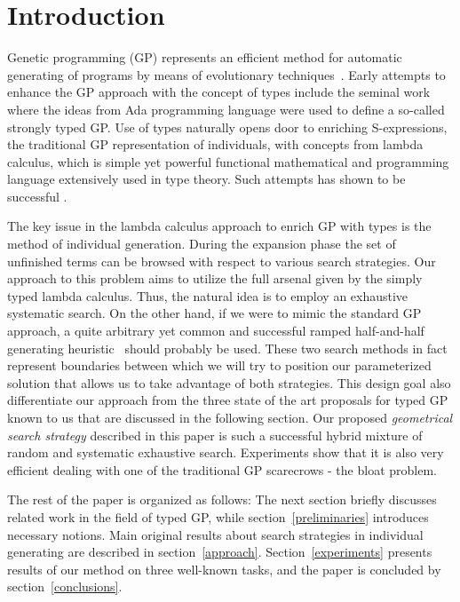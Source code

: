 \documentclass{sig-alternate}
\begin{document}


\section{Introduction}

Genetic programming (GP) represents an efficient method for automatic generating of programs by means of evolutionary techniques~\cite{koza92,koza03}. Early attempts to enhance the GP approach with the concept of types include the seminal work~\cite{montana95} where the ideas from Ada programming language were used to define a so-called strongly typed GP.   
Use of types naturally opens door to enriching S-expressions,
the traditional GP representation of individuals, with concepts from
lambda calculus, which is simple yet powerful functional mathematical and programming 
language extensively used in type theory. Such attempts has shown to be 
successful \cite{yu01}. 

The key issue in the lambda calculus approach to enrich GP with types is the method of individual generation. During the expansion phase the set of unfinished terms can be browsed with respect to various search strategies. Our approach to this problem aims to utilize the full arsenal given by the simply typed lambda calculus. Thus, the natural idea is to employ an exhaustive systematic search. On the other hand, if we were to mimic the standard GP approach, a quite arbitrary yet common and successful ramped half-and-half generating heuristic~\cite{fg} should probably be used.  
These two search methods in fact represent boundaries between which we will try to position our parameterized solution that allows us to take advantage of both strategies. This design goal also differentiate our approach from 
the three state of the art proposals for typed GP known to us that are discussed in the following section. 
Our proposed \emph{geometrical search strategy} described in this paper is such a successful hybrid mixture of random and systematic exhaustive search. Experiments show that it is also very efficient dealing with one of the traditional GP scarecrows - the bloat problem.

The rest of the paper is organized as follows: The next section briefly discusses related work in the field of typed GP, while section~\ref{preliminaries} introduces necessary notions. Main original results about search strategies in individual generating are described in section~\ref{approach}. Section~\ref{experiments} presents results of our method on three well-known tasks, and the paper is concluded by section~\ref{conclusions}.
\end{document}
